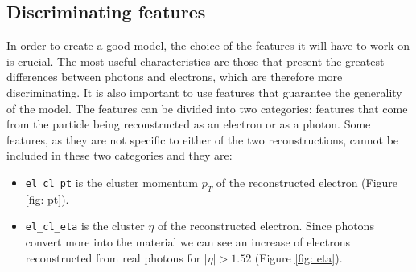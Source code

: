 \documentclass[a4paper, oneside, 11pt, openright]{book}
\begin{document}
			\subsection{Discriminating features}
				In order to create a good model, the choice of the features it will have to work on is crucial. The most useful characteristics are those that present the greatest differences between photons and electrons, which are therefore more discriminating. It is also important to use features that guarantee the generality of the model. The features can be divided into two categories: features that come from the particle being reconstructed as an electron or as a photon.
				Some features, as they are not specific to either of the two reconstructions, cannot be included in these two categories and they are:
				\begin{itemize}
					\item \texttt{el\_cl\_pt} is the cluster momentum $p_T$ of the reconstructed electron (Figure \ref{fig: pt}).
					\item \texttt{el\_cl\_eta} is the cluster $\eta$ of the reconstructed electron. Since photons convert more into the material we can see an increase of electrons reconstructed from real photons for $|\eta|>1.52$ (Figure \ref{fig: eta}). 
				\end{itemize}
\end{document}
